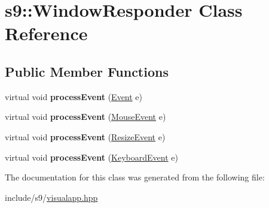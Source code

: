\hypertarget{classs9_1_1WindowResponder}{\section{s9\-:\-:\-Window\-Responder \-Class \-Reference}
\label{classs9_1_1WindowResponder}
}
\subsection*{\-Public \-Member \-Functions}
\begin{DoxyCompactItemize}
\item 
\hypertarget{classs9_1_1WindowResponder_a8d0f74300c1bbc3107d48be8d41b2416}{virtual void {\bfseries process\-Event} (\hyperlink{structs9_1_1Event}{\-Event} e)}\label{classs9_1_1WindowResponder_a8d0f74300c1bbc3107d48be8d41b2416}

\item 
\hypertarget{classs9_1_1WindowResponder_a11fd04e73cc1ab1a02a494fdf5a566d2}{virtual void {\bfseries process\-Event} (\hyperlink{structs9_1_1MouseEvent}{\-Mouse\-Event} e)}\label{classs9_1_1WindowResponder_a11fd04e73cc1ab1a02a494fdf5a566d2}

\item 
\hypertarget{classs9_1_1WindowResponder_a9f272d8df1f0709586d8ed6f51133f87}{virtual void {\bfseries process\-Event} (\hyperlink{structs9_1_1ResizeEvent}{\-Resize\-Event} e)}\label{classs9_1_1WindowResponder_a9f272d8df1f0709586d8ed6f51133f87}

\item 
\hypertarget{classs9_1_1WindowResponder_a5ab3ad222e62d209332c40d0be44a373}{virtual void {\bfseries process\-Event} (\hyperlink{structs9_1_1KeyboardEvent}{\-Keyboard\-Event} e)}\label{classs9_1_1WindowResponder_a5ab3ad222e62d209332c40d0be44a373}

\end{DoxyCompactItemize}


\-The documentation for this class was generated from the following file\-:\begin{DoxyCompactItemize}
\item 
include/s9/\hyperlink{visualapp_8hpp}{visualapp.\-hpp}\end{DoxyCompactItemize}
